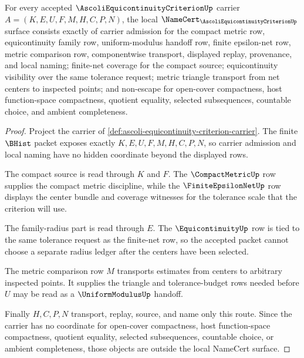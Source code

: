 \begin{theorem}
\label{thm:ascoli-equicontinuity-criterion-namecert-obligations}
For every accepted $\AscoliEquicontinuityCriterionUp$ carrier $A=(K,E,U,F,M,H,C,P,N)$, the local $\NameCert_{\AscoliEquicontinuityCriterionUp}$ surface consists exactly of carrier admission for the compact metric row, equicontinuity family row, uniform-modulus handoff row, finite epsilon-net row, metric comparison row, componentwise transport, displayed replay, provenance, and local naming; finite-net coverage for the compact source; equicontinuity visibility over the same tolerance request; metric triangle transport from net centers to inspected points; and non-escape for open-cover compactness, host function-space compactness, quotient equality, selected subsequences, countable choice, and ambient completeness.
\end{theorem}
\begin{proof}
Project the carrier of \autoref{def:ascoli-equicontinuity-criterion-carrier}. The finite $\BHist$ packet exposes exactly $K,E,U,F,M,H,C,P,N$, so carrier admission and local naming have no hidden coordinate beyond the displayed rows.

The compact source is read through $K$ and $F$. The $\CompactMetricUp$ row supplies the compact metric discipline, while the $\FiniteEpsilonNetUp$ row displays the center bundle and coverage witnesses for the tolerance scale that the criterion will use.

The family-radius part is read through $E$. The $\EquicontinuityUp$ row is tied to the same tolerance request as the finite-net row, so the accepted packet cannot choose a separate radius ledger after the centers have been selected.

The metric comparison row $M$ transports estimates from centers to arbitrary inspected points. It supplies the triangle and tolerance-budget rows needed before $U$ may be read as a $\UniformModulusUp$ handoff.

Finally $H,C,P,N$ transport, replay, source, and name only this route. Since the carrier has no coordinate for open-cover compactness, host function-space compactness, quotient equality, selected subsequences, countable choice, or ambient completeness, those objects are outside the local NameCert surface.
\end{proof}

